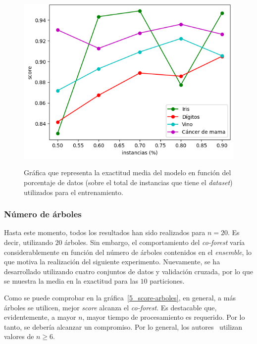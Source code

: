 \begin{figure}[h]
	\caption{Gráfica que representa la exactitud media del modelo en función del porcentaje de datos (sobre el total de instancias que tiene el \textit{dataset}) utilizados para el entrenamiento.}
	\centering
	\includegraphics[scale=0.75]{../img/memoria/5_score-porcentaje_entrenamiento}
	\label{5_score-porcentaje_entrenamiento}
\end{figure}

\subsubsection{Número de árboles}

Hasta este momento, todos los resultados han sido realizados para $n=20$. Es decir, utilizando $20$ árboles. Sin embargo, el comportamiento del \textit{co-forest} varía considerablemente en función del número de árboles contenidos en el \textit{ensemble}, lo que motiva la realización del siguiente experimento. Nuevamente, se ha desarrollado utilizando cuatro conjuntos de datos y validación cruzada, por lo que se muestra la media en la exactitud para las $10$ particiones.

Como se puede comprobar en la gráfica~\ref{5_score-arboles}, en general, a más árboles se utilicen, mejor \textit{score} alcanza el \textit{co-forest}. Es destacable que, evidentemente, a mayor $n$, mayor tiempo de procesamiento es requerido. Por lo tanto, se debería alcanzar un compromiso. Por lo general, los autores~\cite{originalCoForest2007} utilizan valores de $n \geq 6$.

